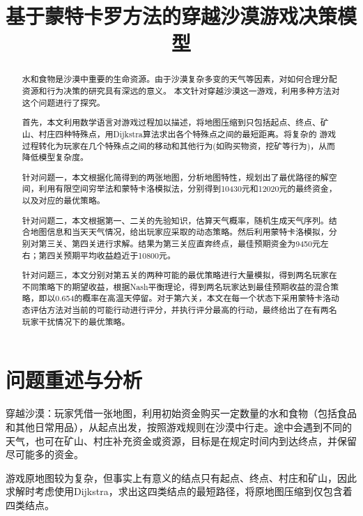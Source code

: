 \documentclass[withoutpreface,bwprint]{cumcmthesis} %
\title{基于蒙特卡罗方法的穿越沙漠游戏决策模型}
\begin{document}
\maketitle
\begin{abstract}
水和食物是沙漠中重要的生命资源。由于沙漠复杂多变的天气等因素，对如何合理分配资源和行为决策的研究具有深远的意义。
本文针对穿越沙漠这一游戏，利用多种方法对这个问题进行了探究。

首先，本文利用数学语言对游戏过程加以描述，将地图压缩到只包括起点、终点、矿山、村庄四种特殊点，用Dijkstra算法求出各个特殊点之间的最短距离。将复杂的
游戏过程转化为玩家在几个特殊点之间的移动和其他行为(如购买物资，挖矿等行为)，从而降低模型复杂度。

针对问题一，本文根据化简得到的两张地图，分析地图特性，规划出了最优路径的解空间，利用有限空间穷举法和蒙特卡洛模拟法，分别得到10430元和12020元的最终资金，以及对应的最优策略。

针对问题二，本文根据第一、二关的先验知识，估算天气概率，随机生成天气序列。结合地图信息和当天天气情况，给出玩家应采取的动态策略。然后利用蒙特卡洛模拟，分别对第三关、第四关进行求解。结果为第三关应直奔终点，最佳预期资金为9450元左右；第四关预期平均收益趋近于10800元。

针对问题三，本文分别对第五关的两种可能的最优策略进行大量模拟，得到两名玩家在不同策略下的期望收益，根据Nash平衡理论，得到两名玩家达到最佳预期收益的混合策略，即以0.654的概率在高温天停留。对于第六关，本文在每一个状态下采用蒙特卡洛动态评估方法对当前的可能行动进行评分，并执行评分最高的行动，最终给出了在有两名玩家干扰情况下的最优策略。

\end{abstract}


\section{问题重述与分析}
穿越沙漠：玩家凭借一张地图，利用初始资金购买一定数量的水和食物（包括食品和其他日常用品），从起点出发，按照游戏规则在沙漠中行走。途中会遇到不同的天气，也可在矿山、村庄补充资金或资源，目标是在规定时间内到达终点，并保留尽可能多的资金。

游戏原地图较为复杂，但事实上有意义的结点只有起点、终点、村庄和矿山，因此求解时考虑使用Dijkstra\cite{dijkstra}，求出这四类结点的最短路径，将原地图压缩到仅包含着四类结点。
\end{document}
